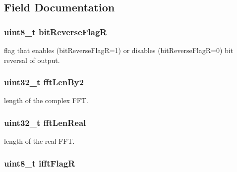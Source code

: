 \subsection{Field Documentation}
\hypertarget{structarm__rfft__instance__q15_ad56ec2425e2422108b8767b43d944591}{
\subsubsection[{bit\-Reverse\-Flag\-R}]{\setlength{\rightskip}{0pt plus 5cm}uint8\-\_\-t bit\-Reverse\-Flag\-R}}\label{structarm__rfft__instance__q15_ad56ec2425e2422108b8767b43d944591}
flag that enables (bit\-Reverse\-Flag\-R=1) or disables (bit\-Reverse\-Flag\-R=0) bit reversal of output. \hypertarget{structarm__rfft__instance__q15_ae7db13e0e2999656d98c4223de5b1284}{
\subsubsection[{fft\-Len\-By2}]{\setlength{\rightskip}{0pt plus 5cm}uint32\-\_\-t fft\-Len\-By2}}\label{structarm__rfft__instance__q15_ae7db13e0e2999656d98c4223de5b1284}
length of the complex F\-F\-T. \hypertarget{structarm__rfft__instance__q15_adf0d4604cf5546075d9d4cf122d6c986}{
\subsubsection[{fft\-Len\-Real}]{\setlength{\rightskip}{0pt plus 5cm}uint32\-\_\-t fft\-Len\-Real}}\label{structarm__rfft__instance__q15_adf0d4604cf5546075d9d4cf122d6c986}
length of the real F\-F\-T. \hypertarget{structarm__rfft__instance__q15_a787d72055c89e4d62b188d6bd646341c}{
\subsubsection[{ifft\-Flag\-R}]{\setlength{\rightskip}{0pt plus 5cm}uint8\-\_\-t ifft\-Flag\-R}}\label{structarm__rfft__instance__q15_a787d72055c89e4d62b188d6bd646341c}
